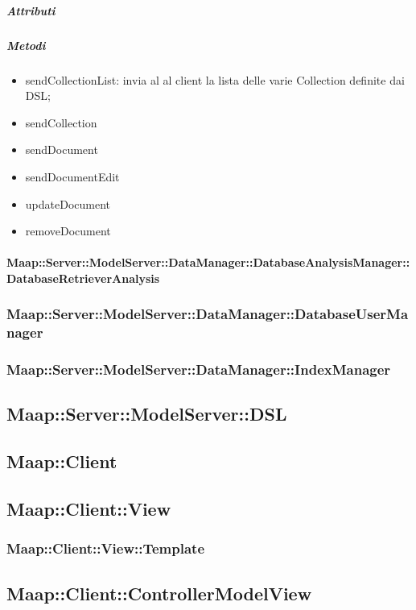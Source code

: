 \subparagraph{Attributi}

\subparagraph{Metodi}
\begin{itemize}
\item{sendCollectionList:} invia al al client la lista delle varie Collection 
definite dai DSL; 
\item{sendCollection}
\item{sendDocument}
\item{sendDocumentEdit}
\item{updateDocument}
\item{removeDocument}
\end{itemize}

\paragraph{Maap::Server::ModelServer::DataManager::DatabaseAnalysisManager::DatabaseRetrieverAnalysis}

\subsubsection{Maap::Server::ModelServer::DataManager::DatabaseUserManager}

\subsubsection{Maap::Server::ModelServer::DataManager::IndexManager}

\subsection{Maap::Server::ModelServer::DSL}

\subsection{Maap::Client}

\subsection{Maap::Client::View}

\subsubsection{Maap::Client::View::Template}

\subsection{Maap::Client::ControllerModelView}

